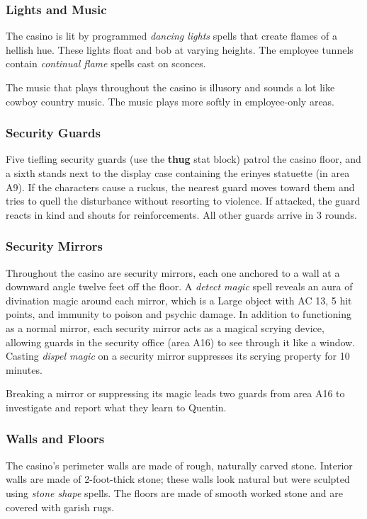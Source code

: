 \documentclass[10pt,a4paper,twoside,bg=print,twocolumn,openany,nodeprecatedcode]{dndbook}
\begin{document}
\subsubsection{Lights and Music}
The casino is lit by programmed \textit{dancing lights} spells that create flames of a hellish hue. These lights float and bob at varying heights. The employee tunnels contain \textit{continual flame} spells cast on sconces.

The music that plays throughout the casino is illusory and sounds a lot like cowboy country music. The music plays more softly in employee-only areas.

\subsubsection{Security Guards}
Five tiefling security guards (use the \textbf{thug} stat block) patrol the casino floor, and a sixth stands next to the display case containing the erinyes statuette (in area A9). If the characters cause a ruckus, the nearest guard moves toward them and tries to quell the disturbance without resorting to violence. If attacked, the guard reacts in kind and shouts for reinforcements. All other guards arrive in 3 rounds.

\subsubsection{Security Mirrors}
Throughout the casino are security mirrors, each one anchored to a wall at a downward angle twelve feet off the floor. A \textit{detect magic} spell reveals an aura of divination magic around each mirror, which is a Large object with AC 13, 5 hit points, and immunity to poison and psychic damage. In addition to functioning as a normal mirror, each security mirror acts as a magical scrying device, allowing guards in the security office (area A16) to see through it like a window. Casting \textit{dispel magic} on a security mirror suppresses its scrying property for 10 minutes.

Breaking a mirror or suppressing its magic leads two guards from area A16 to investigate and report what they learn to Quentin.

\subsubsection{Walls and Floors}
The casino's perimeter walls are made of rough, naturally carved stone. Interior walls are made of 2-foot-thick stone; these walls look natural but were sculpted using \textit{stone shape} spells. The floors are made of smooth worked stone and are covered with garish rugs.
\end{document}
